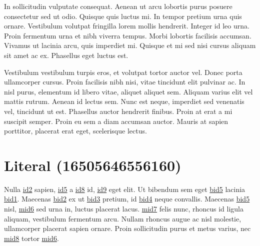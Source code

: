 \sphinxAtStartPar
In sollicitudin vulputate consequat. Aenean ut arcu lobortis purus posuere consectetur sed ut odio.
Quisque quis luctus mi. In tempor pretium urna quis ornare. Vestibulum volutpat fringilla lorem
mollis hendrerit. Integer id leo urna. Proin fermentum urna et nibh viverra tempus. Morbi lobortis
facilisis accumsan. Vivamus ut lacinia arcu, quis imperdiet mi. Quisque et mi sed nisi cursus
aliquam sit amet ac ex. Phasellus eget luctus est.

\sphinxAtStartPar
Vestibulum vestibulum turpis eros, et volutpat tortor auctor vel. Donec porta ullamcorper cursus.
Proin facilisis nibh nisi, vitae tincidunt elit pulvinar ac. In nisl purus, elementum id libero
vitae, aliquet aliquet sem. Aliquam varius elit vel mattis rutrum. Aenean id lectus sem. Nunc est
neque, imperdiet sed venenatis vel, tincidunt ut est. Phasellus auctor hendrerit finibus. Proin at
erat a mi suscipit semper. Proin eu sem a diam accumsan auctor. Mauris at sapien porttitor, placerat
erat eget, scelerisque lectus.


\section{Literal (16505646556160)}
\label{\detokenize{test:literal-16505646556160}}\begin{sphinxalltt}
Nulla \hyperlink{\detokenize{id2}}{id2} sapien, \hyperlink{\detokenize{id5}}{id5} a
\hyperlink{\detokenize{id8}}{id8} id, \hyperlink{\detokenize{id9}}{id9} eget elit. \hypertarget{\detokenize{id10}}{Ut}
bibendum sem eget \hyperlink{\detokenize{bid5-ref32}}{\hypertarget{\detokenize{bid5}}{bid5}} lacinia \hyperlink{\detokenize{bid1}}{\hypertarget{\detokenize{bid1-ref28}}{bid1}}. Maecenas
\hyperlink{\detokenize{bid2}}{\hypertarget{\detokenize{bid2-ref29}}{bid2}} ex
ut \hyperlink{\detokenize{bid3}}{\hypertarget{\detokenize{bid3-ref30}}{bid3}} pretium, id \hyperlink{\detokenize{bid4}}{\hypertarget{\detokenize{bid4-ref31}}{bid4}} neque convallis. Maecenas
\hyperlink{\detokenize{bid5}}{\hypertarget{\detokenize{bid5-ref32}}{bid5}} nisl, \hyperlink{\detokenize{test-mid6-id1}}{\hypertarget{\detokenize{test-mid6-id0}}{mid6}} sed urna in, luctus placerat
lacus. \hyperlink{\detokenize{test-mid7-id0}}{\hypertarget{\detokenize{test-mid7-id1}}{mid7}} felis nunc, rhoncus id ligula aliquam, vestibulum fermentum arcu. Nullam rhoncus augue
ac nisl molestie, ullamcorper placerat sapien ornare. Proin sollicitudin purus et metus varius, nec
\hyperlink{\detokenize{test-mid8-id1}}{\hypertarget{\detokenize{test-mid8-id0}}{mid8}} tortor \hyperlink{\detokenize{test-mid6-id0}}{\hypertarget{\detokenize{test-mid6-id1}}{mid6}}.
\end{sphinxalltt}

